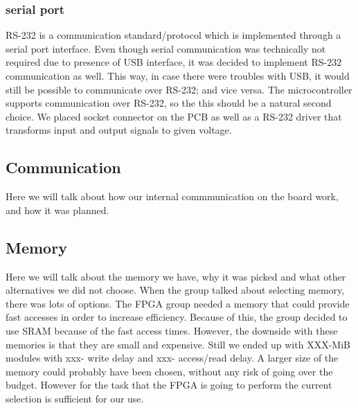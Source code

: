 

\subsubsection{serial port} 
RS-232 is a communication standard/protocol which is implemented through a serial port interface.
Even though serial communication was technically not required due to presence of USB interface, it was decided to implement RS-232 communication as well.
This way, in case there were troubles with USB, it would still be possible to communicate over RS-232; and vice versa.
The microcontroller supports communication over RS-232, so the this should be a natural second choice.
We placed socket connector on the PCB as well as a RS-232 driver that transforms input and output signals to given voltage.

\subsection{Communication} \label{pcb:design-choices:ss:internal_communication}

Here we will talk about how our internal commmunication on the board work, and how it was planned.

\subsection{Memory} \label{pcb:design-choices:ss:memory}
Here we will talk about the memory we have, why it was picked and what other alternatives we did not choose.
When the group talked about selecting memory, there was lots of options. The FPGA group needed a memory that could provide 
fast accesses in order to increase efficiency. Because of this, the group decided to use SRAM because of the fast access times.
However, the downside with these memories is that they are small and expensive. Still we ended up with XXX-MiB modules with xxx- write delay and xxx- access/read delay.
A larger size of the memory could probably have been chosen, without any risk of going over the budget. However for the task that the FPGA is going to perform
the current selection is sufficient for our use.
